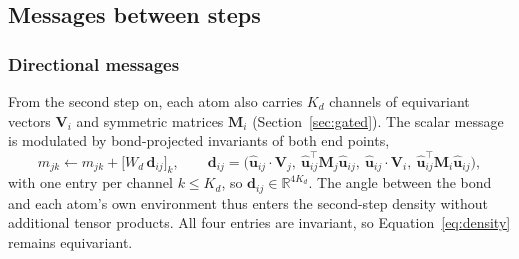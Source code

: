 \documentclass[journal=jctcce,manuscript=article,layout=traditional]{achemso}
\newcommand{\vect}[1]{\bm{#1}}
\begin{document}
\subsection{Messages between steps}
\subsubsection{Directional messages}
From the second step on, each atom also carries $K_d$ channels of equivariant vectors $\vect V_i$ and symmetric
matrices $\vect M_i$ (Section~\ref{sec:gated}). The scalar message is modulated by bond-projected invariants of both
end points,
\begin{equation}
m_{jk}\leftarrow m_{jk}+\big[W_d\,\vect d_{ij}\big]_k,\qquad
\vect d_{ij}=\big(\hat{\vect u}_{ij}\!\cdot\vect V_j,\ \hat{\vect u}_{ij}^{\top}\vect M_j\hat{\vect u}_{ij},\
\hat{\vect u}_{ij}\!\cdot\vect V_i,\ \hat{\vect u}_{ij}^{\top}\vect M_i\hat{\vect u}_{ij}\big),
\label{eq:directional}
\end{equation}
with one entry per channel $k\le K_d$, so $\vect d_{ij}\in\mathbb R^{4K_d}$. The angle between the bond and each
atom's own environment thus enters the second-step density without additional tensor products. All four entries
are invariant, so Equation~\ref{eq:density} remains equivariant.
\end{document}
